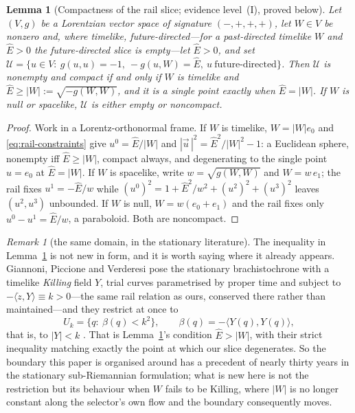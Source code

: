 \documentclass[12pt]{iopart}
\theoremstyle{plain}
\newtheorem{lemma}[proposition]{Lemma}
\theoremstyle{definition}
\theoremstyle{remark}
\newtheorem{remark}[proposition]{Remark}
\newcommand{\Ehat}{\hat E}
\begin{document}
\begin{lemma}[Compactness of the rail slice; evidence level~(I), proved below]
\label{lem:compact}
Let $(V,g)$ be a Lorentzian vector space of signature $(-,+,+,+)$, let $W\in V$
be nonzero and, where timelike, future-directed---for a past-directed timelike
$W$ and $\Ehat>0$ the future-directed slice is empty---let $\Ehat>0$, and set
$\mathcal U=\{u\in V:\ g(u,u)=-1,\ -g(u,W)=\Ehat,\ u\ \text{future-directed}\}$.
Then $\mathcal U$ is nonempty and compact if and only if $W$ is timelike and
$\Ehat\ge|W|:=\sqrt{-g(W,W)}$, and it is a single point exactly when
$\Ehat=|W|$. If $W$ is null or spacelike, $\mathcal U$ is either empty or
noncompact.
\end{lemma}

\begin{proof}
Work in a Lorentz-orthonormal frame. If $W$ is timelike, $W=|W|e_0$ and
\eqref{eq:rail-constraints} give $u^0=\Ehat/|W|$ and
$|\vec u\,|^2=\Ehat^2/|W|^2-1$: a Euclidean sphere, nonempty iff $\Ehat\ge|W|$,
compact always, and degenerating to the single point $u=e_0$ at $\Ehat=|W|$. If
$W$ is spacelike, write $w=\sqrt{g(W,W)}$ and $W=w\,e_1$; the rail fixes $u^1=-\Ehat/w$
while $(u^0)^2=1+\Ehat^2/w^2+(u^2)^2+(u^3)^2$ leaves $(u^2,u^3)$ unbounded. If $W$ is
null, $W=w(e_0+e_1)$ and the rail fixes only $u^0-u^1=\Ehat/w$, a paraboloid.
Both are noncompact.
\end{proof}

\begin{remark}[the same domain, in the stationary literature]
\label{rmk:gpv-domain}
The inequality in Lemma~\ref{lem:compact} is not new in form, and it is worth
saying where it already appears. Giannoni, Piccione and Verderesi pose the
stationary brachistochrone with a timelike \emph{Killing} field $Y$, trial curves
parametrised by proper time and subject to $-\langle\dot z,Y\rangle\equiv k>0$---the
same rail relation as ours, conserved there rather than maintained---and they
restrict at once to
\begin{equation}
    U_k=\{q:\ \beta(q)<k^2\},\qquad \beta(q)=-\langle Y(q),Y(q)\rangle ,
    \label{eq:gpv-Uk}
\end{equation}
that is, to $|Y|<k$ \cite[Eqs.~(2)--(3)]{GiannoniPiccioneVerderesi1997}. That is
Lemma~\ref{lem:compact}'s condition $\Ehat>|W|$, with their strict inequality
matching exactly the point at which our slice degenerates. So the boundary this
paper is organised around has a precedent of nearly thirty years in the stationary
sub-Riemannian formulation; what is new here is not the restriction but its
behaviour when $W$ fails to be Killing, where $|W|$ is no longer constant along the
selector's own flow and the boundary consequently moves.
\end{remark}
\end{document}
